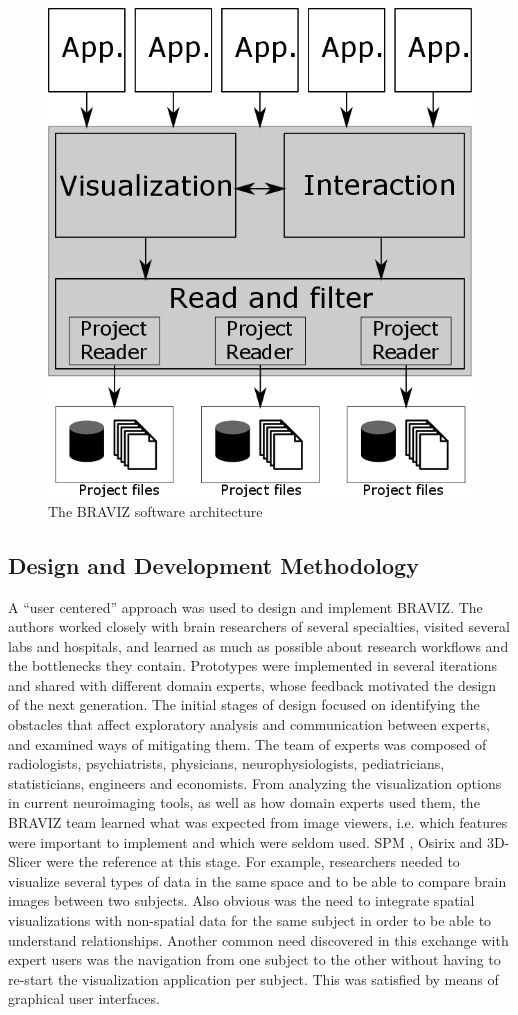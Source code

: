 \documentclass[twocolumn]{svjour3}
\begin{document}
\begin{figure}
\begin{center}
\includegraphics[width=0.6\linewidth]{figures/arquitecture.png}
\end{center}
 \caption{\label{fig_arch} The BRAVIZ software architecture}
\end{figure}


\subsection{Design and Development Methodology}

A ``user centered'' approach \cite{wassink_applying_2009} was used to design and implement BRAVIZ. The authors worked closely with brain researchers of several specialties, visited several labs and hospitals, and learned as much as possible about research workflows and the bottlenecks they contain. Prototypes were implemented in several iterations and shared with different domain experts, whose feedback motivated the design of the next generation.
The initial stages of design focused on identifying the obstacles that affect exploratory analysis and communication between experts, and examined ways of mitigating them. The team of experts was composed of radiologists, psychiatrists, physicians, neurophysiologists, pediatricians, statisticians, engineers and economists.
From analyzing the visualization options in current neuroimaging tools, as well as how domain experts used them, the BRAVIZ team learned what was expected from image viewers, i.e. which features were important to implement and which were seldom used. SPM \cite{friston_statistical_2007}, Osirix \cite{rosset_osirix:_2004} and 3D-Slicer \cite{fedorov_3d_2012} were the reference at this stage. For example, researchers needed to visualize several types of data in the same space and to be able to compare brain images between two subjects. Also obvious was the need to integrate spatial visualizations with non-spatial data for the same subject in order to be able to understand relationships. Another common need discovered in this exchange with expert users was the navigation from one subject to the other without having to re-start the visualization application per subject. This was satisfied by means of graphical user interfaces.
\end{document}
